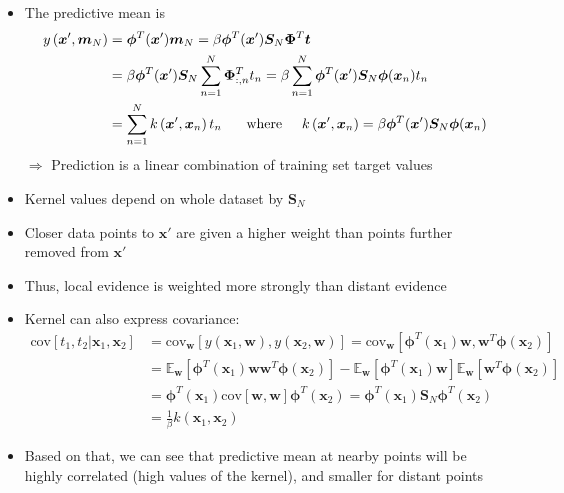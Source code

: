 \begin{itemize}
	\begin{itemize}
		\item The predictive mean is 
		\begin{equation*}
		\begin{split}
			y\left(\bm{x}', \bm{m}_N\right) & = \bm{\phi}^T(\bm{x}') \bm{m}_N = \beta \bm{\phi}^T(\bm{x}')\bm{S}_N \bm{\Phi}^T \bm{t}\\
			& = \beta \bm{\phi}^T(\bm{x}')\bm{S}_N \sum\limits_{n=1}^{N}\bm{\Phi}_{:,n}^T t_n = \beta \sum\limits_{n=1}^{N} \bm{\phi}^T(\bm{x}')\bm{S}_N \bm{\phi}(\bm{x}_n) t_n\\
			& = \sum\limits_{n=1}^{N} k\left(\bm{x}',\bm{x}_n\right) t_n \text{\hspace{5mm} 
				where\hspace{5mm}} k\left(\bm{x}',\bm{x}_n\right)=\beta \bm{\phi}^T(\bm{x}')\bm{S}_N \bm{\phi}(\bm{x}_n)
		\end{split}
		\end{equation*}
		$\Rightarrow$ Prediction is a linear combination of training set target values
		\item Kernel values depend on whole dataset by $\bm{S}_N$
		\item Closer data points to $\bm{x}'$ are given a higher weight than points further removed from $\bm{x}'$
		\item Thus, local evidence is weighted more strongly than distant evidence
		\item Kernel can also express covariance:
		\begin{equation*}
		\begin{split}
		\text{cov}\left[t_1, t_2 | \bm{x}_1, \bm{x}_2\right] & = \text{cov}_{\bm{w}}\left[y(\bm{x}_1, \bm{w}), y(\bm{x}_2, \bm{w})\right] = \text{cov}_{\bm{w}}\left[\bm{\phi}^T(\bm{x}_1)\bm{w}, \bm{w}^T\bm{\phi}(\bm{x}_2)\right]\\
		& = \mathbb{E}_{\bm{w}}\left[\bm{\phi}^T(\bm{x}_1)\bm{w} \bm{w}^T\bm{\phi}(\bm{x}_2)\right] - \mathbb{E}_{\bm{w}}\left[\bm{\phi}^T(\bm{x}_1)\bm{w}\right]\mathbb{E}_{\bm{w}}\left[\bm{w}^T\bm{\phi}(\bm{x}_2)\right]\\
		& = \bm{\phi}^T(\bm{x}_1)\text{cov}\left[\bm{w},\bm{w}\right] \bm{\phi}^T(\bm{x}_2) = \bm{\phi}^T(\bm{x}_1)\bm{S}_N \bm{\phi}^T(\bm{x}_2)\\
		& = \frac{1}{\beta}k\left(\bm{x}_1,\bm{x}_2\right) 
		\end{split}
		\end{equation*}
		\item Based on that, we can see that predictive mean at nearby points will be highly correlated (high values of the kernel), and smaller for distant points

\end{itemize}
\end{itemize}

